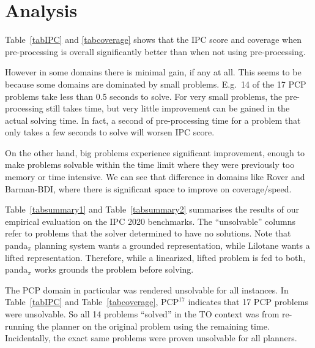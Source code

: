 \newpage

\section{Analysis}

Table~\ref{tabIPC} and \ref{tabcoverage} shows that the IPC score and coverage when pre-processing is overall significantly better than when not using pre-processing. 

However in some domains there is minimal gain, if any at all. This seems to be because some domains are dominated by small problems. E.g.\ 14 of the 17 PCP problems take less than 0.5 seconds to solve. For very small problems, the pre-processing still takes time, but very little improvement can be gained in the actual solving time. In fact, a second of pre-processing time for a problem that only takes a few seconds to solve will worsen IPC score. 

On the other hand, big problems experience significant improvement, enough to make problems solvable within the time limit where they were previously too memory or time intensive. We can see that difference in domains like Rover and Barman-BDI, where there is significant space to improve on coverage/speed.




Table~\ref{tabsummary1} and Table~\ref{tabsummary2} summarises the results of our empirical evaluation on the IPC 2020 benchmarks. The \enquote{unsolvable} columns refer to problems that the solver determined to have no solutions. 
Note that panda$_\pi$ planning system wants a grounded representation, while Lilotane wants a lifted representation. Therefore, while a linearized, lifted problem is fed to both, panda$_\pi$ works grounds the problem before solving.

The PCP domain in particular was rendered unsolvable for all instances.  In Table~\ref{tabIPC} and Table~\ref{tabcoverage}, $\text{PCP}^{17}$ indicates that 17 PCP problems were unsolvable. So all 14 problems \enquote{solved} in the TO context was from re-running the planner on the original problem using the remaining time. Incidentally, the exact same problems were proven unsolvable for all planners.

